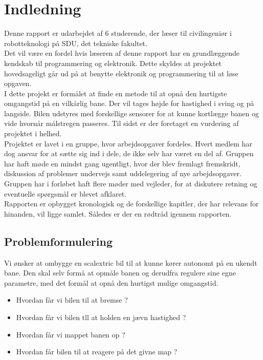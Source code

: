 \section{Indledning}

Denne rapport er udarbejdet af 6 studerende, der læser til civilingeniør i robotteknologi på SDU, det tekniske fakultet.\\

Det vil være en fordel hvis læseren af denne rapport har en grundlæggende kendskab til programmering og elektronik. Dette skyldes at projektet hovedsageligt går ud på at benytte elektronik og programmering til at løse opgaven.\\

I dette projekt er formålet at finde en metode til at opnå den hurtigste omgangstid på en vilkårlig bane. Der vil tages højde for hastighed i sving og på langside. Bilen udstyres med forskellige sensorer for at kunne kortlægge banen og vide hvornår målstregen passeres. Til sidst er der foretaget en vurdering af projektet i helhed.\\

Projektet er lavet i en gruppe, hvor arbejdsopgaver fordeles. Hvert medlem har dog ansvar for at sætte sig ind i dele, de ikke selv har været en del af. Gruppen har haft møde en mindst gang ugentligt, hvor der blev fremlagt fremskridt, diskussion af problemer undervejs samt uddelegering af nye arbejdsopgaver. Gruppen har i forløbet haft flere møder med vejleder, for at diskutere retning og eventuelle spørgsmål er blevet afklaret.\\

Rapporten er opbygget kronologisk og de forskellige kapitler, der har relevans for hinanden, vil ligge samlet. Således er der en rødtråd igennem rapporten.\\


\subsection{Problemformulering}

Vi ønsker at ombygge en scalextric bil til at kunne kører autonomt på en ukendt bane. Den skal selv formå at opmåle banen og derudfra regulere sine egne parametre, med det formål at opnå den hurtigst mulige omgangstid.
\begin{itemize}
	\item Hvordan får vi bilen til at bremse ?
	\item Hvordan får vi bilen tll at holden en jævn hastighed ?
	\item Hvordan får vi mappet banen op ?
	\item Hvordan får bilen til at reagere på det givne map ?
\end{itemize}

